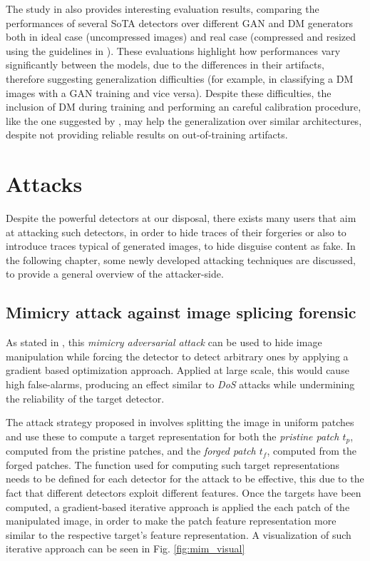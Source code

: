 \documentclass[conference]{IEEEtran} %
\begin{document}
        The study in \cite{corvi2023detection} also provides interesting evaluation results, comparing the performances of several SoTA detectors over different GAN and DM generators both in ideal case (uncompressed images) and real case (compressed and resized using the guidelines in \cite{vipcuplink}). These evaluations highlight how performances vary significantly between the models, due to the differences in their artifacts, therefore suggesting generalization difficulties (for example, in classifying a DM images with a GAN training and vice versa). Despite these difficulties, the inclusion of DM during training and performing an careful calibration procedure, like the one suggested by \cite{Platt1999probabilistic}, may help the generalization over similar architectures, despite not providing reliable results on out-of-training artifacts.
\section{Attacks}
    Despite the powerful detectors at our disposal, there exists many users that aim at attacking such detectors, in order to hide traces of their forgeries or also to introduce traces typical of generated images, to hide disguise content as fake. In the following chapter, some newly developed attacking techniques are discussed, to provide a general overview of the attacker-side.

    \subsection{Mimicry attack against image splicing forensic}
        As stated in \cite{boato2024adversarial}, this \textit{mimicry adversarial attack} can be used to hide image manipulation while forcing the detector to detect arbitrary ones by applying a gradient based optimization approach. Applied at large scale, this would cause high false-alarms, producing an effect similar to \textit{DoS} attacks while undermining the reliability of the target detector.

        The attack strategy proposed in \cite{boato2024adversarial} involves splitting the image in uniform patches and use these to compute a target representation for both the \textit{pristine patch $t_p$}, computed from the pristine patches, and the \textit{forged patch $t_f$}, computed from the forged patches. The function used for computing such target representations needs to be defined for each detector for the attack to be effective, this due to the fact that different detectors exploit different features. Once the targets have been computed, a gradient-based iterative approach is applied the each patch of the manipulated image, in order to make the patch feature representation more similar to the respective target's feature representation. A visualization of such iterative approach can be seen in Fig. \ref{fig:mim_visual}
\end{document}
